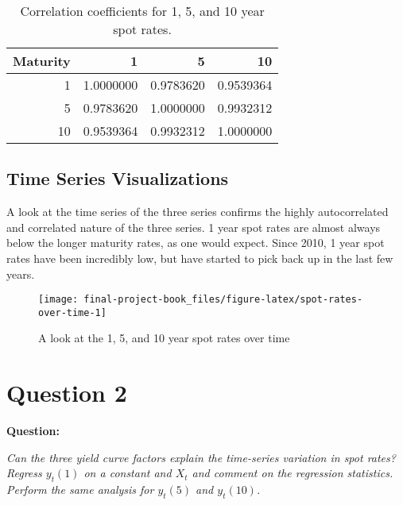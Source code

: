 \documentclass[openany]{book}
\theoremstyle{definition}
\theoremstyle{definition}
\theoremstyle{definition}
\theoremstyle{remark}
\begin{document}
\small

\begin{table}[H]

\caption{\label{tab:correlations}Correlation coefficients for 1, 5, and 10 year spot rates.}
\centering
\begin{tabular}[t]{rrrr}
\toprule
Maturity & 1 & 5 & 10\\
\midrule
1 & 1.0000000 & 0.9783620 & 0.9539364\\
5 & 0.9783620 & 1.0000000 & 0.9932312\\
10 & 0.9539364 & 0.9932312 & 1.0000000\\
\bottomrule
\end{tabular}
\end{table}

\normalsize

\hypertarget{time-series-visualizations}{%
\section{Time Series Visualizations}\label{time-series-visualizations}}

A look at the time series of the three series confirms the highly
autocorrelated and correlated nature of the three series. 1 year spot
rates are almost always below the longer maturity rates, as one would
expect. Since 2010, 1 year spot rates have been incredibly low, but have
started to pick back up in the last few years.

\small

\begin{figure}[H]

{\centering \texttt{[image: final-project-book\_files/figure-latex/spot-rates-over-time-1]} 

}

\caption{A look at the 1, 5, and 10 year spot rates over time}\label{fig:spot-rates-over-time}
\end{figure}

\normalsize

\small

\normalsize

\hypertarget{q2}{%
\chapter{Question 2}\label{q2}}

\textbf{Question:}

\emph{Can the three yield curve factors explain the time-series
variation in spot rates? Regress \(y_t(1)\) on a constant and \(X_t\)
and comment on the regression statistics. Perform the same analysis for
\(y_t(5)\) and \(y_t(10)\).}
\end{document}
